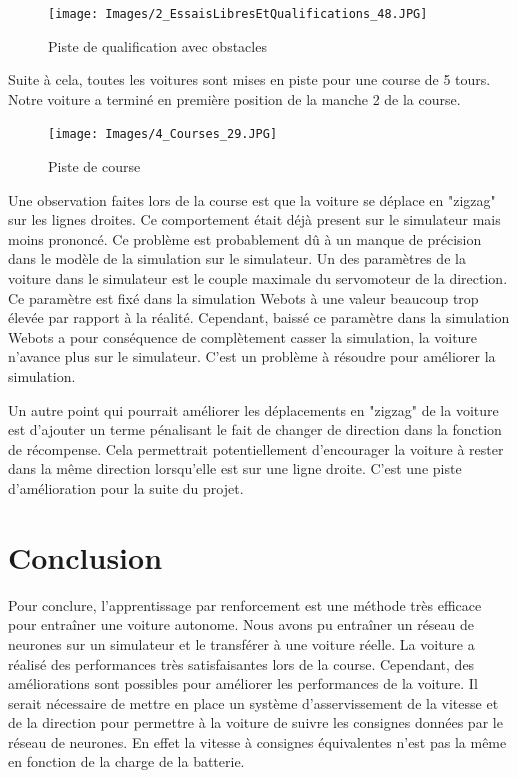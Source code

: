 \documentclass[french]{article}
\begin{document}
\begin{figure}[H]
    \centering
    \texttt{[image: Images/2\_EssaisLibresEtQualifications\_48.JPG]}
    \caption{Piste de qualification avec obstacles}
\end{figure}

Suite à cela, toutes les voitures sont mises en piste pour une course de 5 tours. Notre voiture a terminé en première 
position de la manche 2 de la course.

\begin{figure}[H]
    \centering
    \texttt{[image: Images/4\_Courses\_29.JPG]}
    \caption{Piste de course}
\end{figure}

Une observation faites lors de la course est que la voiture se déplace en "zigzag" sur les lignes droites. Ce 
comportement était déjà present sur le simulateur mais moins prononcé. Ce problème est probablement dû à un manque
de précision dans le modèle de la simulation sur le simulateur. Un des paramètres de la voiture dans le simulateur
est le couple maximale du servomoteur de la direction. Ce paramètre est fixé dans la simulation Webots à une valeur
beaucoup trop élevée par rapport à la réalité. Cependant, baissé ce paramètre dans la simulation Webots a pour
conséquence de complètement casser la simulation, la voiture n'avance plus sur le simulateur. C'est un problème 
à résoudre pour améliorer la simulation.

\vspace{0.5cm}
Un autre point qui pourrait améliorer les déplacements en "zigzag" de la voiture est d'ajouter un terme pénalisant 
le fait de changer de direction dans la fonction de récompense. Cela permettrait potentiellement d'encourager la 
voiture à rester dans la même direction lorsqu'elle est sur une ligne droite. C'est une piste d'amélioration pour 
la suite du projet.


    



\section{Conclusion}

Pour conclure, l'apprentissage par renforcement est une méthode très efficace pour entraîner une voiture autonome.
Nous avons pu entraîner un réseau de neurones sur un simulateur et le transférer à une voiture réelle. La voiture
a réalisé des performances très satisfaisantes lors de la course. Cependant, des améliorations sont possibles pour
améliorer les performances de la voiture. Il serait nécessaire de mettre en place un système d'asservissement de 
la vitesse et de la direction pour permettre à la voiture de suivre les consignes données par le réseau de neurones.
En effet la vitesse à consignes équivalentes n'est pas la même en fonction de la charge de la batterie.






\printbibliography
\end{document}
